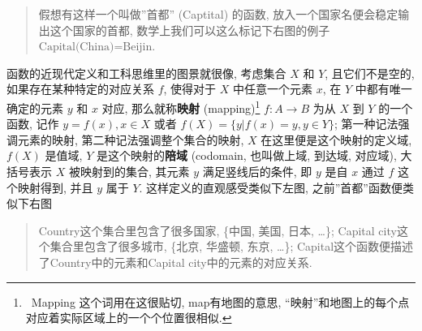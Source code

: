 \begin{quote}
假想有这样一个叫做''首都'' (Captital) 的函数,
放入一个国家名便会稳定输出这个国家的首都,
数学上我们可以这么标记下右图的例子 \(\text{Capital(China)=Beijin}\).
\end{quote}

函数的近现代定义和工科思维里的图景就很像, 考虑集合 \(X\) 和 \(Y\),
且它们不是空的, 如果存在某种特定的对应关系 \(f\), 使得对于 \(X\)
中任意一个元素 \(x\), 在 \(Y\) 中都有唯一确定的元素 \(y\) 和 \(x\) 对应,
那么就称\textbf{映射} (mapping)\footnote{~Mapping 这个词用在这很贴切,
  map有地图的意思,
  ``映射''和地图上的每个点对应着实际区域上的一个个位置很相似.}
\(f: A\rightarrow B\) 为从 \(X\) 到 \(Y\) 的一个函数, 记作
\(y=f(x), x\in X\) 或者 \(f(X)=\{y|f(x)=y, y\in Y\}\);
第一种记法强调元素的映射, 第二种记法强调整个集合的映射, \(X\)
在这里便是这个映射的定义域, \(f(X)\) 是值域, \(Y\)
是这个映射的\textbf{陪域} (codomain, 也叫做上域, 到达域, 对应域),
大括号表示 \(X\) 被映射到的集合, 其元素 \(y\) 满足竖线后的条件, 即 \(y\)
是自 \(x\) 通过 \(f\) 这个映射得到, 并且 \(y\) 属于 \(Y\).
这样定义的直观感受类似下左图, 之前''首都''函数便类似下右图

\begin{quote}
Country这个集合里包含了很多国家, \{中国, 美国, 日本, \ldots\}; Capital
city这个集合里包含了很多城市, \{北京, 华盛顿, 东京, \ldots\};
Capital这个函数便描述了Country中的元素和Capital city中的元素的对应关系.
\end{quote}
